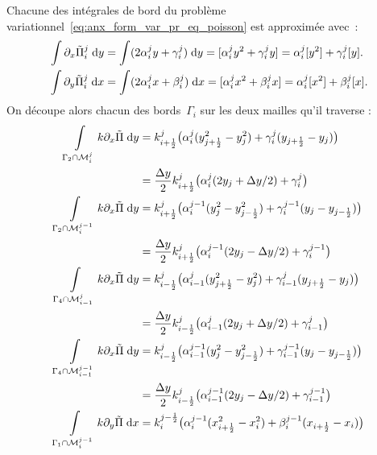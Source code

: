 \documentclass[main.tex]{subfiles}
\begin{document}
Chacune des intégrales de bord du problème variationnel~\eqref{eq:anx_form_var_pr_eq_poisson} est approximée avec~:
\begin{align*}
\int \partial_x \tilde{\Pi}_i^j \;{\rm d}y &= \int (2\alpha_i^jy + \gamma_i^j) \;{\rm d}y = [\alpha_i^jy^2 + \gamma_i^j y ] = \alpha_i^j [y^2] + \gamma_i^j [y]. \\
\int \partial_y \tilde{\Pi}_i^j \;{\rm d}x &= \int (2\alpha_i^jx + \beta_i^j) \;{\rm d}x = [\alpha_i^jx^2 + \beta_i^j x ] = \alpha_i^j [x^2] + \beta_i^j [x ].
\end{align*}
On découpe alors chacun des bords~$\Gamma_i$ sur les deux mailles qu'il traverse :
\begin{align}
\int\limits_{\Gamma_2 \cap \mathcal{M}_i^j} k \partial_x \tilde{\Pi} \dy & =  k_{i+\frac{1}{2}}^j \big( \alpha_i^j ( y^2_{j+\frac{1}{2}} - y^2_j) + \gamma_i^j ( y_{j+\frac{1}{2}} - y_j)\big) \nonumber\\
& = \frac{\Delta y}{2}  k_{i+\frac{1}{2}}^j \big( \alpha_i^j ( 2y_j + \Delta y/2 ) + \gamma_i^j \big) 
\\
\int\limits_{\Gamma_2 \cap \mathcal{M}_i^{j-1}} k \partial_x \tilde{\Pi} \dy  & =  k_{i+\frac{1}{2}}^j \big( \alpha_i^{j-1} (  y^2_j -  y^2_{j-\frac{1}{2}} ) + \gamma_i^{j-1} ( y_j - y_{j-\frac{1}{2}})\big) \nonumber \\  
& = \frac{\Delta y}{2} k_{i+\frac{1}{2}}^j \big( \alpha_i^{j-1} (  2y_j -  \Delta y / 2 ) + \gamma_i^{j-1} \big)
\\
\int\limits_{\Gamma_4 \cap \mathcal{M}_{i-1}^j} k \partial_x \tilde{\Pi} \dy  & =  k_{i-\frac{1}{2}}^j \big( \alpha_{i-1}^j ( y^2_{j+\frac{1}{2}} - y^2_j) + \gamma_{i-1}^j ( y_{j+\frac{1}{2}} - y_j)\big)  \nonumber \\
 & = \frac{\Delta y}{2} k_{i-\frac{1}{2}}^j \big( \alpha_{i-1}^j ( 2 y_j + \Delta y/2) + \gamma_{i-1}^j \big) 
\\
\int\limits_{\Gamma_4 \cap \mathcal{M}_{i-1}^{j-1}} k \partial_x \tilde{\Pi} \dy & =  k_{i-\frac{1}{2}}^j \big( \alpha_{i-1}^{j-1} (  y^2_j -  y^2_{j-\frac{1}{2}} ) + \gamma_{i-1}^{j-1} ( y_j - y_{j-\frac{1}{2}})\big)  \nonumber \\
& = \frac{\Delta y}{2}  k_{i-\frac{1}{2}}^j \big( \alpha_{i-1}^{j-1} (  2 y_j - \Delta y /2 ) + \gamma_{i-1}^{j-1} \big) 
\\
\int\limits_{\Gamma_1 \cap \mathcal{M}_i^{j-1}} k \partial_y \tilde{\Pi} \dx  & =  k_i^{j-\frac{1}{2}} \big( \alpha_i^{j-1} ( x^2_{i+\frac{1}{2}} - x^2_i) + \beta_i^{j-1} ( x_{i+\frac{1}{2}} - x_i)\big)  \nonumber \\

\end{align}
\end{document}
